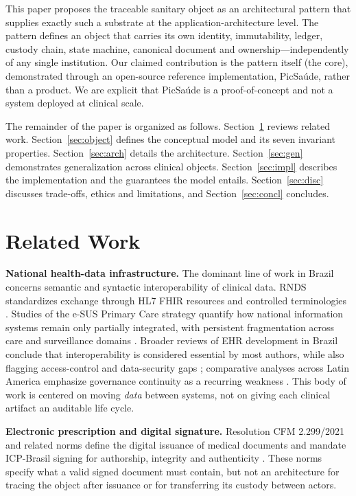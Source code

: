 \documentclass[conference]{IEEEtran}
\begin{document}
This paper proposes the traceable sanitary object as an architectural pattern that supplies exactly such a substrate at the application-architecture level. The pattern defines an object that carries its own identity, immutability, ledger, custody chain, state machine, canonical document and ownership---independently of any single institution. Our claimed contribution is the pattern itself (the core), demonstrated through an open-source reference implementation, PicSa\'ude, rather than a product. We are explicit that PicSa\'ude is a proof-of-concept and not a system deployed at clinical scale.

The remainder of the paper is organized as follows. Section~\ref{sec:related} reviews related work. Section~\ref{sec:object} defines the conceptual model and its seven invariant properties. Section~\ref{sec:arch} details the architecture. Section~\ref{sec:gen} demonstrates generalization across clinical objects. Section~\ref{sec:impl} describes the implementation and the guarantees the model entails. Section~\ref{sec:disc} discusses trade-offs, ethics and limitations, and Section~\ref{sec:concl} concludes.

\section{Related Work}\label{sec:related}
\textbf{National health-data infrastructure.} The dominant line of work in Brazil concerns semantic and syntactic interoperability of clinical data. RNDS standardizes exchange through HL7 FHIR resources and controlled terminologies \cite{rnds,rndsfhir}. Studies of the e-SUS Primary Care strategy quantify how national information systems remain only partially integrated, with persistent fragmentation across care and surveillance domains \cite{esus}. Broader reviews of EHR development in Brazil conclude that interoperability is considered essential by most authors, while also flagging access-control and data-security gaps \cite{barbalho}; comparative analyses across Latin America emphasize governance continuity as a recurring weakness \cite{conrado}. This body of work is centered on moving \emph{data} between systems, not on giving each clinical artifact an auditable life cycle.

\textbf{Electronic prescription and digital signature.} Resolution CFM 2.299/2021 and related norms define the digital issuance of medical documents and mandate ICP-Brasil signing for authorship, integrity and authenticity \cite{cfm}. These norms specify what a valid signed document must contain, but not an architecture for tracing the object after issuance or for transferring its custody between actors.
\end{document}
